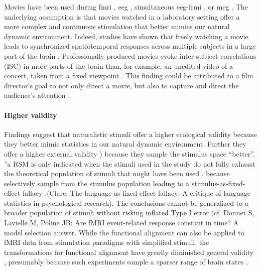 Movies have been used during \ac{fmri} \citep{bartels2004mapping,
hasson2004intersubject}, \ac{eeg} \citep{dmochowski2014audience,
krause2000relative}, simultaneous \ac{eeg}-\ac{frmi}
\citep{whittingstall2010integration}, or \ac{meg} \citep{lankinen2014isc-meg,
luo2010auditory}.
%
The underlying assumption is that movies watched in a laboratory setting offer a
more complex and continuous stimulation that better mimics our natural dynamic
environment.
%
Indeed, studies have shown that freely watching a movie leads to synchronized
spatiotemporal responses across multiple subjects in a large part of the brain
\citep{hasson2010reliability, lankinen2014isc-meg}.
%
Professionally produced movies evoke inter-subject correlations (ISC) in more
parts of the brain than, for example, an unedited video of a concert, taken from
a fixed viewpoint \citep{hasson2010reliabilitiy}.
%
This finding could be attributed to a film director's goal to not only direct a
movie, but also to capture and direct the audience's attention
\citep{brown2012cinematography, dancyger2011film-technique}.




\paragraph{Higher validity}
%
Findings suggest that naturalistic stimuli offer a higher ecological validity
\citep{hasson2004intersubject} because they better mimic statistics in our
natural dynamic environment.
%
Further they offer a higher external validity \citep{westfall2016fixing})
because they sample the stimulus space ``better''.
%
''a RSM is only indicated when the stimuli used in the study do not fully
exhaust the theoretical population of stimuli that might have been used \citep{westfall2016fixing}.
%
because selectively sample from the stimulus population leading to a
stimulus-as-fixed-effect fallacy \citep{westfall2016fixing}.(Clarc, The
language-as-fixed-effect fallacy: A critique of language statistics in
psychological research).
%
The conclusions cannot be generalized to a broader population of stimuli without
risking inflated Type I error  (cf. Donnet S, Lavielle
M, Poline JB: Are fMRI event-related response constant in time? A model
selection answer\citep{westfall2016fixing)}.
%
While the functional alignment can also be applied to fMRI data from stimulation
paradigms with simplified stimuli, the transformations for functional alignment
have greatly diminished general validity \citep{haxby2011common}, presumably
because such experiments sample a sparser range of brain states
\citep{guntupalli2016model}.

